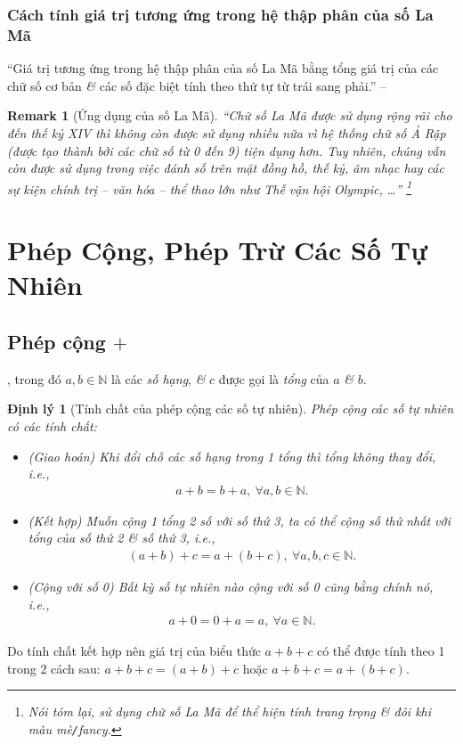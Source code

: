 \documentclass[oneside]{book}
\numberwithin{equation}{section}
\newtheorem{remark}{Remark}[section]
\newtheorem{dinhly}{Định lý}[section]
\begin{document}
\subsubsection{Cách tính giá trị tương ứng trong hệ thập phân của số La Mã}
``Giá trị tương ứng trong hệ thập phân của số La Mã bằng tổng giá trị của các chữ số cơ bản \textit{\&} các số đặc biệt tính theo thứ tự từ trái sang phải.'' -- \cite[p. 14]{Thai_Anh_Dat_Ha_Loan_Nam_Quang_Toan_6_tap_1}

\begin{remark}[Ứng dụng của số La Mã]
	``Chữ số La Mã được sử dụng rộng rãi cho đến thế kỷ XIV thì không còn được sử dụng nhiều nữa vì hệ thống chữ số Ả Rập (được tạo thành bởi các chữ số từ 0 đến 9) tiện dụng hơn. Tuy nhiên, chúng vẫn còn được sử dụng trong việc đánh số trên mặt đồng hồ, thế kỷ, âm nhạc hay các sự kiện chính trị -- văn hóa -- thể thao lớn như Thế vận hội Olympic, \ldots'' \footnote{Nói tóm lại, sử dụng chữ số La Mã để thể hiện tính trang trọng \textit{\&} đôi khi màu mè\texttt{/}fancy.}
\end{remark}


\section{Phép Cộng, Phép Trừ Các Số Tự Nhiên}

\subsection{Phép cộng $+$}
, trong đó $a,b\in\mathbb{N}$ là các \textit{số hạng}, \textit{\&} $c$ được gọi là \textit{tổng} của $a$ \textit{\&} $b$.

\begin{dinhly}[Tính chất của phép cộng các số tự nhiên]
	Phép cộng các số tự nhiên có các tính chất:
	\begin{itemize}
		\item (Giao hoán) Khi đổi chỗ các số hạng trong 1 tổng thì tổng không thay đổi, i.e.,
		\begin{align*}
			a + b = b + a,\ \forall a,b\in\mathbb{N}.
		\end{align*}
		\item (Kết hợp) Muốn cộng 1 tổng 2 số với số thứ 3, ta có thể cộng số thứ nhất với tổng của số thứ 2 \textit{\&} số thứ 3, i.e.,
		\begin{align*}
			(a + b) + c = a +(b + c),\ \forall a,b,c\in\mathbb{N}.
		\end{align*}
		\item (Cộng với số 0) Bất kỳ số tự nhiên nào cộng với số 0 cũng bằng chính nó, i.e.,
		\begin{align*}
			a + 0 = 0 + a = a,\ \forall a\in\mathbb{N}.
		\end{align*}
	\end{itemize}
\end{dinhly}
Do tính chất kết hợp nên giá trị của biểu thức $a + b + c$ có thể được tính theo 1 trong 2 cách sau: $a + b + c = (a + b) + c$ hoặc $a + b + c = a + (b + c)$.
\end{document}

